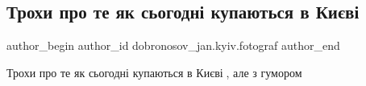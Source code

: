  
 
 
 
 

\subsection{Трохи про те як сьогодні купаються в Києві}
\label{sec:19_01_2023.fb.dobronosov_jan.kyiv.fotograf.1.trokhi_pro_te_yak_so}

\ifcmt
 author_begin
   author_id dobronosov_jan.kyiv.fotograf
 author_end
\fi

Трохи про те як сьогодні купаються в Києві🙂, але з гумором🙏😊
